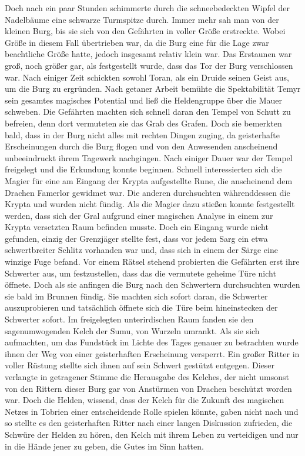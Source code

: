 Doch nach ein paar Stunden schimmerte durch die schneebedeckten Wipfel der Nadelbäume eine schwarze Turmspitze durch. Immer mehr sah man von der kleinen Burg, bis sie sich von den Gefährten in voller Größe erstreckte. Wobei Größe in diesem Fall übertrieben war, da die Burg eine für die Lage zwar beachtliche Größe hatte, jedoch insgesamt relativ klein war. Das Erstaunen war groß, noch größer gar, als festgestellt wurde, dass das Tor der Burg verschlossen war. Nach einiger Zeit schickten sowohl Toran, als ein Druide seinen Geist aus, um die Burg zu ergründen. Nach getaner Arbeit bemühte die Spektabilität Temyr sein gesamtes magisches Potential und ließ die Heldengruppe über die Mauer schweben. Die Gefährten machten sich schnell daran den Tempel von Schutt zu befreien, denn dort vermuteten sie das Grab des Grafen. Doch sie bemerkten bald, dass in der Burg nicht alles mit rechten Dingen zuging, da geisterhafte Erscheinungen durch die Burg flogen und von den Anwesenden anscheinend unbeeindruckt ihrem Tagewerk nachgingen. Nach einiger Dauer war der Tempel freigelegt und die Erkundung konnte beginnen. Schnell interessierten sich die Magier für eine am Eingang der Krypta aufgestellte Rune, die anscheinend dem Drachen Famerlor gewidmet war. Die anderen durchsuchten währenddessen die Krypta und wurden nicht fündig. Als die Magier dazu stießen konnte festgestellt werden, dass sich der Gral aufgrund einer magischen Analyse in einem zur Krypta versetzten Raum befinden musste. Doch ein Eingang wurde nicht gefunden, einzig der Grenzjäger stellte fest, dass vor jedem Sarg ein etwa schwertbreiter Schlitz vorhanden war und, dass sich in einem der Särge eine winzige Fuge befand. Vor einem Rätsel stehend probierten die Gefährten erst ihre Schwerter aus, um festzustellen, dass das die vermutete geheime Türe nicht öffnete. Doch als sie anfingen die Burg nach den Schwertern durchsuchten wurden sie bald im Brunnen fündig. Sie machten sich sofort daran, die Schwerter auszuprobieren und tatsächlich öffnete sich die Türe beim hineinstecken der Schwerter sofort. Im freigelegten unterirdischen Raum fanden sie den sagenumwogenden Kelch der Sumu, von Wurzeln umrankt. Als sie sich aufmachten, um das Fundstück im Lichte des Tages genauer zu betrachten wurde ihnen der Weg von einer geisterhaften Erscheinung versperrt. Ein großer Ritter in voller Rüstung stellte sich ihnen auf sein Schwert gestützt entgegen. Dieser verlangte in getragener Stimme die Herausgabe des Kelches, der nicht umsonst von den Rittern dieser Burg gar von Anstürmen von Drachen beschützt worden war. Doch die Helden, wissend, dass der Kelch für die Zukunft des magischen Netzes in Tobrien einer entscheidende Rolle spielen könnte, gaben nicht nach und so stellte es den geisterhaften Ritter nach einer langen Diskussion zufrieden, die Schwüre der Helden zu hören, den Kelch mit ihrem Leben zu verteidigen und nur in die Hände jener zu geben, die Gutes im Sinn hatten.

